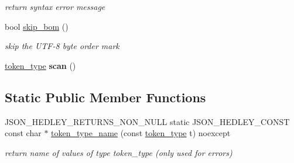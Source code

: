 \begin{DoxyCompactItemize}
\begin{DoxyCompactList}\small\item\em return syntax error message \end{DoxyCompactList}\item 
bool \mbox{\hyperlink{classnlohmann_1_1detail_1_1lexer_a709afd52def2e258dac0b8a67dc4ea26}{skip\+\_\+bom}} ()
\begin{DoxyCompactList}\small\item\em skip the U\+T\+F-\/8 byte order mark \end{DoxyCompactList}\item 
\mbox{\label{classnlohmann_1_1detail_1_1lexer_aac3041cd2b9291e64fee38db422863c9}} 
\mbox{\hyperlink{classnlohmann_1_1detail_1_1lexer_a3f313cdbe187cababfc5e06f0b69b098}{token\+\_\+type}} {\bfseries scan} ()
\end{DoxyCompactItemize}
\subsection*{Static Public Member Functions}
\begin{DoxyCompactItemize}
\item 
\mbox{\label{classnlohmann_1_1detail_1_1lexer_adb831e1f692a45c2281ed3d59ddf1e17}} 
J\+S\+O\+N\+\_\+\+H\+E\+D\+L\+E\+Y\+\_\+\+R\+E\+T\+U\+R\+N\+S\+\_\+\+N\+O\+N\+\_\+\+N\+U\+LL static J\+S\+O\+N\+\_\+\+H\+E\+D\+L\+E\+Y\+\_\+\+C\+O\+N\+ST const char $\ast$ \mbox{\hyperlink{classnlohmann_1_1detail_1_1lexer_adb831e1f692a45c2281ed3d59ddf1e17}{token\+\_\+type\+\_\+name}} (const \mbox{\hyperlink{classnlohmann_1_1detail_1_1lexer_a3f313cdbe187cababfc5e06f0b69b098}{token\+\_\+type}} t) noexcept
\begin{DoxyCompactList}\small\item\em return name of values of type token\+\_\+type (only used for errors) \end{DoxyCompactList}\end{DoxyCompactItemize}
